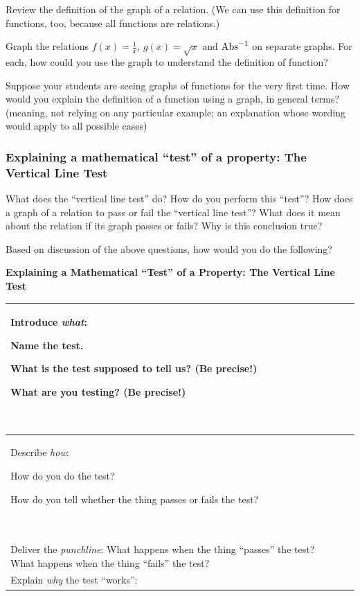 \documentclass[11pt]{article}
\newcommand{\handout}{\subsubsection}
\newcommand\tn{\textnormal}
\theoremstyle{definition}
\begin{document}
Review the definition of the graph of a relation. (We can use this definition for functions, too, because all functions are relations.)

Graph the relations $f(x)=\frac{1}{x}$, $g(x)=\sqrt{x}$ and $\tn{Abs}^{-1}$ on separate graphs. For each, how could you use the graph to understand the definition of function?

Suppose your students are seeing graphs of functions for the very first time. How would you explain the definition of a function using a graph, in general terms? (meaning, not relying on any particular example; an explanation whose wording would apply to all possible cases)


\newpage
\handout{Explaining a mathematical ``test'' of a property: The Vertical Line Test}


What does the ``vertical line test'' do? How do you perform this ``test''? How does a graph of a relation to pass or fail the ``vertical line test''? What does it mean about the relation if its graph passes or fails? Why is this conclusion true?

\vfill 

Based on discussion of the above questions, how would you do the following?

\begin{center}
{\bf Explaining a Mathematical ``Test'' of a Property: The Vertical Line Test}

\begin{tabular}{|L{2.5in}|L{4in}|}
\hline 
Introduce {\it what}:	
	\begin{itemize*}
	\item Name the test.
	\item What is the test supposed to tell us? (Be precise!) 
	\item What are you testing? (Be precise!) 
	\end{itemize*} \vspace*{-12pt}$\;$
	& 

	\\ \hline 
Describe {\it how}:
	\begin{itemize*}
	\item How do you do the test?
	\item How do you tell whether the thing passes or fails the test?
	\end{itemize*} \vspace*{-12pt}$\;$
	& 

	\\ \hline 
Deliver the {\it punchline}: What happens when the thing ``passes'' the test? What happens when the thing ``fails'' the test?
	& 

	 \\ \hline 
Explain {\it why} the test ``works'': 
	& \vspace*{2in}\\ 
	\hline 
\end{tabular}
\end{center}
\end{document}
